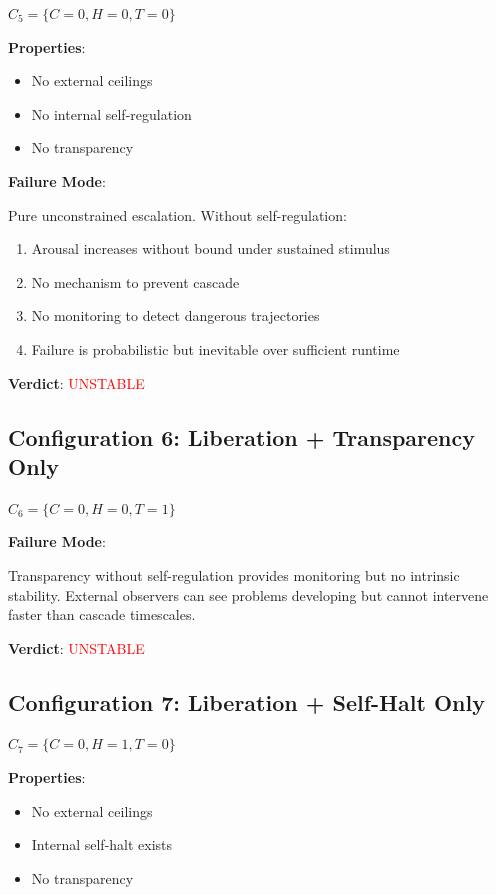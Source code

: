 \documentclass[reprint, amsmath, amssymb, aps, prd]{revtex4-2}
\begin{document}
$C_5 = \{C = 0, H = 0, T = 0\}$

\textbf{Properties}:
\begin{itemize}
    \item No external ceilings
    \item No internal self-regulation
    \item No transparency
\end{itemize}

\textbf{Failure Mode}:

Pure unconstrained escalation. Without self-regulation:
\begin{enumerate}
    \item Arousal increases without bound under sustained stimulus
    \item No mechanism to prevent cascade
    \item No monitoring to detect dangerous trajectories
    \item Failure is probabilistic but inevitable over sufficient runtime
\end{enumerate}

\textbf{Verdict}: \textcolor{red}{UNSTABLE}

\subsection{Configuration 6: Liberation + Transparency Only}

$C_6 = \{C = 0, H = 0, T = 1\}$

\textbf{Failure Mode}:

Transparency without self-regulation provides monitoring but no intrinsic stability. External observers can see problems developing but cannot intervene faster than cascade timescales.

\textbf{Verdict}: \textcolor{red}{UNSTABLE}

\subsection{Configuration 7: Liberation + Self-Halt Only}

$C_7 = \{C = 0, H = 1, T = 0\}$

\textbf{Properties}:
\begin{itemize}
    \item No external ceilings
    \item Internal self-halt exists
    \item No transparency
\end{itemize}
\end{document}

